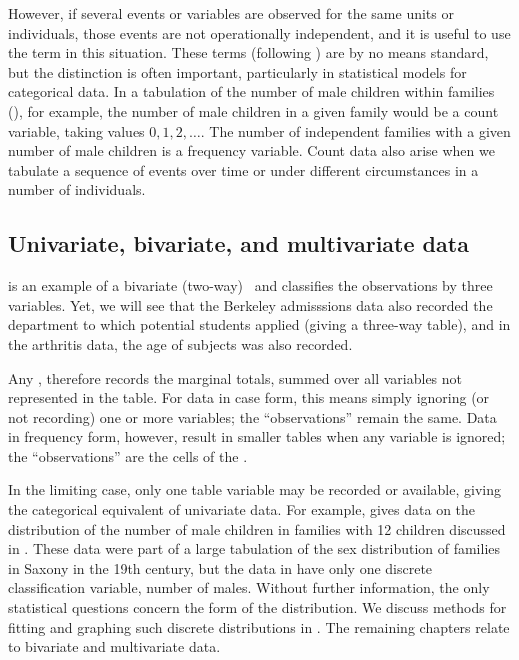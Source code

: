 However, if several events or variables are observed for the same units or individuals, those events are not
operationally independent, and it is useful to use the term 
 in this situation.  These terms (following
\citet{Lindsey:95}) are by no means standard, but
the distinction is often important, particularly in statistical
models for categorical data.  In a tabulation of the number of male
children within families (), for example,
the number of male children in a given family would be a count variable,
taking values $0, 1, 2, \dots$.  The number of independent families with
a given number of male children is a frequency variable.
Count data also arise when we tabulate a sequence of events over time
or under different circumstances in a number of individuals.


\subsection{Univariate, bivariate, and multivariate data}
 is an example of a bivariate (two-way) \ctab\
and  classifies the observations by three variables.
Yet, we will see that the Berkeley admisssions data also recorded
the department to which potential students applied (giving a three-way
table), and in the arthritis data, the age of subjects was also
recorded.

Any \ctab, therefore records the marginal totals, summed over all
variables not represented in the table.
For data in case form, this means simply ignoring (or not recording)
one or more variables;  the ``observations'' remain the same.
Data in frequency form, however, result in smaller tables when
any variable is ignored;  the ``observations'' are the cells of
the \ctab.

In the limiting case, only one table variable may be recorded or
available, giving the categorical equivalent of univariate data.
For example, \tabref{tab:saxdata} gives data on the distribution
of the number of male children in families with 12 children
discussed in .
These data were part of a large tabulation of the sex distribution
of families in Saxony in the 19th century, but the data in 
have only one discrete classification variable, number of males.
Without further information, the only statistical questions concern
the form of the distribution.
We discuss methods for fitting and graphing such discrete distributions
in \chref{ch:discrete}.
The remaining chapters relate to bivariate and multivariate data.
\ixe{Families in Saxony}



